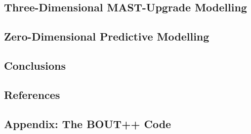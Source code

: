 \documentclass[11pt]{article}
\begin{document}
\subsection{Three-Dimensional MAST-Upgrade Modelling}
\subsection{Zero-Dimensional Predictive Modelling}
\subsection{Conclusions}
\subsection{References}
\subsection{Appendix: The BOUT++ Code}
\end{document}
